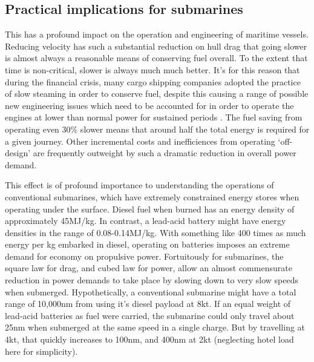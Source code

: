 \documentclass{article}\usepackage[]{graphicx}\usepackage[]{color}
\begin{document}
\subsection{Practical implications for submarines}
This has a profound impact on the operation and engineering of maritime vessels.  Reducing velocity has such a substantial reduction on hull drag that going slower is almost always a reasonable means of conserving fuel overall.  To the extent that time is non-critical, slower is always much much better.  It's for this reason that during the financial crisis, many cargo shipping companies adopted the practice of slow steaming \parencite{liang2014} in order to conserve fuel, despite this causing a range of possible new engineering issues which need to be accounted for in order to operate the engines at lower than normal power for sustained periods \parencite[8-10]{sanguri2012}. The fuel saving from operating even 30\% slower means that around half the total energy is required for a given journey.  Other incremental costs and inefficiences from operating `off-design' are frequently outweight by such a dramatic reduction in overall power demand.

This effect is of profound importance to understanding the operations of conventional submarines, which have extremely constrained energy stores when operating under the surface. Diesel fuel when burned has an energy density of approximately 45MJ/kg.  In contrast, a lead-acid battery might have energy densities in the range of 0.08-0.14MJ/kg. With something like 400 times as much energy per kg embarked in diesel, operating on batteries imposes an extreme demand for economy on propulsive power.  Fortuitously for submarines, the square law for drag, and cubed law for power, allow an almost commensurate reduction in power demands to take place by slowing down to very slow speeds when submerged. Hypothetically, a conventional submarine might have a total range of 10,000nm from using it's diesel payload at 8kt.  If an equal weight of lead-acid batteries as fuel were carried, the submarine could only travel about 25nm when submerged at the same speed in a single charge.  But by travelling at 4kt, that quickly increases to 100nm, and 400nm at 2kt (neglecting hotel load here for simplicity).
\end{document}
